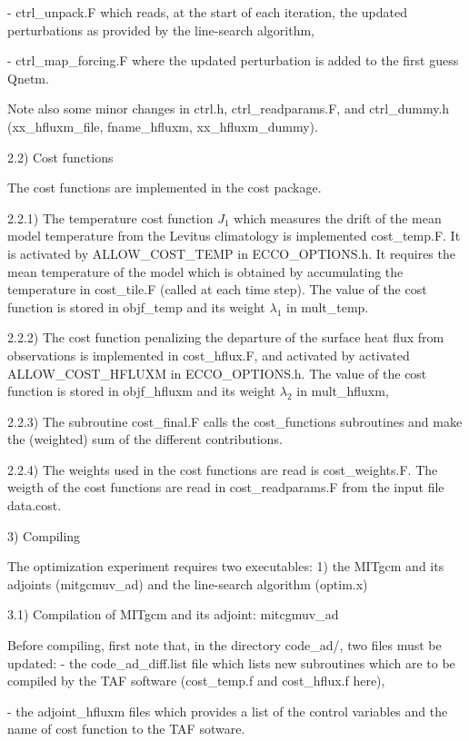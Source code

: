 - ctrl\_unpack.F which reads, at the start of each iteration, the updated perturbations as
provided by the line-search algorithm,

- ctrl\_map\_forcing.F where the updated perturbation is added to the first guess Qnetm.

Note also some minor changes in ctrl.h, ctrl\_readparams.F, and ctrl\_dummy.h (xx\_hfluxm\_file,
fname\_hfluxm, xx\_hfluxm\_dummy).

2.2) Cost functions

The cost functions are implemented in the cost package.

2.2.1) The temperature cost function $J_1$ which measures the drift of the mean model
temperature from the Levitus climatology is implemented cost\_temp.F. It is
activated by ALLOW\_COST\_TEMP in ECCO\_OPTIONS.h. It requires the mean temperature of
the model which is obtained by accumulating the temperature in cost\_tile.F (called at
each time step).
The value of the cost function is stored in objf\_temp and its weight $\lambda_1$
in mult\_temp.

2.2.2) The cost function penalizing the departure of the surface heat flux from
observations is implemented in cost\_hflux.F, and activated by activated
ALLOW\_COST\_HFLUXM in ECCO\_OPTIONS.h. The value of the cost function is stored in
objf\_hfluxm and its weight $\lambda_2$ in mult\_hfluxm,

2.2.3) The subroutine cost\_final.F calls the cost\_functions subroutines
and make the (weighted) sum of the different contributions.

2.2.4) The weights used in the cost functions are read is cost\_weights.F.
The weigth of the cost functions are read in cost\_readparams.F from the input file
data.cost.    

3) Compiling 

The optimization experiment requires two executables: 1) the 
MITgcm and its adjoints (mitgcmuv\_ad) and the line-search algorithm (optim.x) 

3.1) Compilation of MITgcm and its adjoint: mitcgmuv\_ad

Before compiling, first note that, in the directory code\_ad/, two files
must be updated:
- the code\_ad\_diff.list file which lists new subroutines which are to be compiled
by the TAF software (cost\_temp.f and cost\_hflux.f here),

- the adjoint\_hfluxm files which provides a list of the control variables and the
name of cost function to the TAF sotware.

